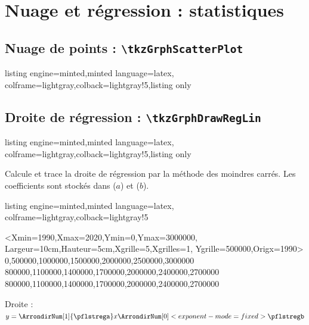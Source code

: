 \documentclass[11pt,a4paper]{ltxdoc}
\begin{document}
\section{Nuage et régression : statistiques}

\subsection{Nuage de points : \texttt{\textbackslash tkzGrphScatterPlot}}

\begin{tcblisting}{listing engine=minted,minted language=latex,
  colframe=lightgray,colback=lightgray!5,listing only}
\end{tcblisting}

\subsection{Droite de régression : \texttt{\textbackslash tkzGrphDrawRegLin}}

\begin{tcblisting}{listing engine=minted,minted language=latex,
  colframe=lightgray,colback=lightgray!5,listing only}
\end{tcblisting}

Calcule et trace la droite de régression par la méthode des moindres carrés. Les coefficients sont stockés dans  ($a$) et  ($b$).

\begin{tcblisting}{listing engine=minted,minted language=latex,
  colframe=lightgray,colback=lightgray!5}
\begin{tkzGrph}
    <Xmin=1990,Xmax=2020,Ymin=0,Ymax=3000000,
    Largeur=10cm,Hauteur=5cm,Xgrille=5,Xgrilles=1,%
    Ygrille=500000,Origx=1990>
    {0,500000,1000000,1500000,2000000,2500000,3000000}
    {800000,1100000,1400000,1700000,2000000,2400000,2700000}
    {800000,1100000,1400000,1700000,2000000,2400000,2700000}
\end{tkzGrph}

Droite : $y = \ArrondirNum[1]{\pflstrega} x \ArrondirNum[0]<exponent-mode=fixed>{\pflstregb}$
\end{tcblisting}
\end{document}
